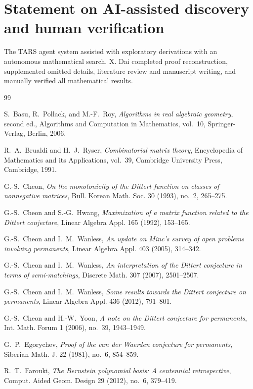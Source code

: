 \documentclass[11pt]{amsart}
\theoremstyle{definition}
\theoremstyle{remark}
\begin{document}
\section*{Statement on AI-assisted discovery and human verification}
The TARS agent system assisted with exploratory derivations with an autonomous mathematical search. X. Dai completed proof reconstruction, supplemented omitted details, literature review and manuscript writing, and manually verified all mathematical results.

\begin{thebibliography}{99}
\raggedright

S.~Basu, R.~Pollack, and M.-F.~Roy,
\emph{Algorithms in real algebraic geometry}, second ed.,
Algorithms and Computation in Mathematics, vol.~10,
Springer-Verlag, Berlin, 2006.

R.~A.~Brualdi and H.~J.~Ryser,
\emph{Combinatorial matrix theory},
Encyclopedia of Mathematics and its Applications, vol.~39,
Cambridge University Press, Cambridge, 1991.

G.-S.~Cheon,
\emph{On the monotonicity of the Dittert function on classes of
nonnegative matrices},
Bull. Korean Math. Soc. 30 (1993), no.~2, 265--275.

G.-S.~Cheon and S.-G.~Hwang,
\emph{Maximization of a matrix function related to the Dittert conjecture},
Linear Algebra Appl. 165 (1992), 153--165.

G.-S.~Cheon and I.~M.~Wanless,
\emph{An update on Minc's survey of open problems involving permanents},
Linear Algebra Appl. 403 (2005), 314--342.

G.-S.~Cheon and I.~M.~Wanless,
\emph{An interpretation of the Dittert conjecture in terms of
semi-matchings},
Discrete Math. 307 (2007), 2501--2507.

G.-S.~Cheon and I.~M.~Wanless,
\emph{Some results towards the Dittert conjecture on permanents},
Linear Algebra Appl. 436 (2012), 791--801.

G.-S.~Cheon and H.-W.~Yoon,
\emph{A note on the Dittert conjecture for permanents},
Int. Math. Forum 1 (2006), no.~39, 1943--1949.

G.~P.~Egorychev,
\emph{Proof of the van der Waerden conjecture for permanents},
Siberian Math. J. 22 (1981), no.~6, 854--859.

R.~T.~Farouki,
\emph{The Bernstein polynomial basis: A centennial retrospective},
Comput. Aided Geom. Design 29 (2012), no.~6, 379--419.


\end{thebibliography}
\end{document}

